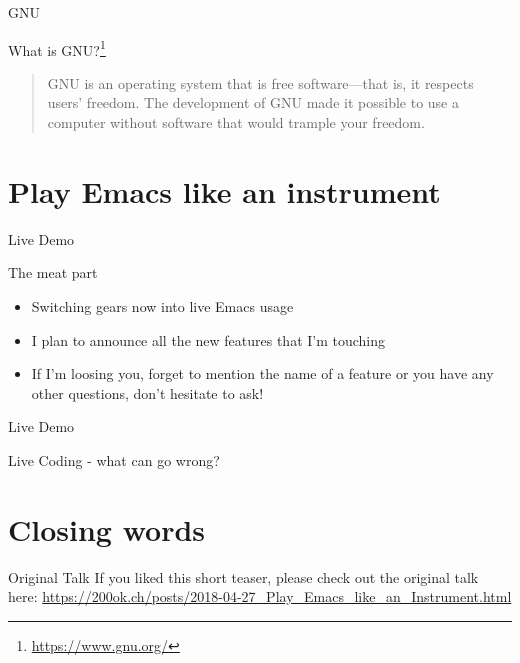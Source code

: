 \documentclass[bigger]{beamer}
\begin{document}
\begin{frame}[label={sec:org4bb5d64}]{GNU}
\begin{block}{What is GNU?\footnote{\url{https://www.gnu.org/}}}
\begin{quote}
GNU is an operating system that is free software—that is, it respects
users' freedom. The development of GNU made it possible to use a
computer without software that would trample your freedom.
\end{quote}
\end{block}
\end{frame}


\section{Play Emacs like an instrument}
\label{sec:orge33b69c}

\begin{frame}[label={sec:org7eb833e}]{Live Demo}
\begin{block}{The meat part}
\begin{itemize}
\item Switching gears now into live Emacs usage
\item I plan to announce all the new features that I'm touching
\item If I'm loosing you, forget to mention the name of a feature or you
have any other questions, don't hesitate to ask!
\end{itemize}
\end{block}
\end{frame}

\begin{frame}[label={sec:org328c90c}]{Live Demo}
\begin{block}{Live Coding - what can go wrong?}
\end{block}
\end{frame}

\section{Closing words}
\label{sec:orgf4fb0fc}

\begin{frame}[label={sec:org93c234b}]{Original Talk}
If you liked this short teaser, please check out the original talk
here:
\url{https://200ok.ch/posts/2018-04-27\_Play\_Emacs\_like\_an\_Instrument.html}
\end{frame}
\end{document}
